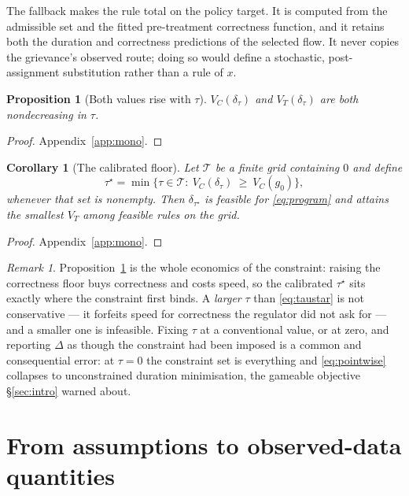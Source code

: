 \documentclass[11pt,a4paper]{article}
\theoremstyle{plain}
\newtheorem{proposition}[theorem]{Proposition}
\newtheorem{corollary}[theorem]{Corollary}
\theoremstyle{definition}
\theoremstyle{remark}
\newtheorem*{remark*}{Remark}
\begin{document}
The fallback makes the rule total on the policy target. It is computed from the admissible set
and the fitted pre-treatment correctness function, and it retains both the duration and
correctness predictions of the selected flow. It never copies the grievance's observed route;
doing so would define a stochastic, post-assignment substitution rather than a rule of $x$.

\begin{proposition}[Both values rise with $\tau$]\label{prop:mono}
$V_C(\delta_\tau)$ and $V_T(\delta_\tau)$ are both nondecreasing in $\tau$.
\end{proposition}

\begin{proof}
Appendix~\ref{app:mono}.
\end{proof}

\begin{corollary}[The calibrated floor]\label{cor:feasible}
Let $\mathcal T$ be a finite grid containing $0$ and define
\begin{equation}
\tau^\star=\min\bigl\{\tau\in\mathcal T:\ V_C(\delta_\tau)\ \ge\ V_C(g_0)\bigr\},
\label{eq:taustar}
\end{equation}
whenever that set is nonempty. Then $\delta_{\tau^\star}$ is feasible for \eqref{eq:program} and
attains the smallest $V_T$ among feasible rules on the grid.
\end{corollary}

\begin{proof}
Appendix~\ref{app:mono}.
\end{proof}

\begin{remark*}
Proposition~\ref{prop:mono} is the whole economics of the constraint: raising the correctness
floor buys correctness and costs speed, so the calibrated $\tau^\star$ sits exactly where the
constraint first binds. A \emph{larger} $\tau$ than \eqref{eq:taustar} is not conservative ---
it forfeits speed for correctness the regulator did not ask for --- and a smaller one is
infeasible. Fixing $\tau$ at a conventional value, or at zero, and reporting $\Delta$ as though
the constraint had been imposed is a common and consequential error: at $\tau=0$ the constraint
set is everything and \eqref{eq:pointwise} collapses to unconstrained duration minimisation, the
gameable objective \S\ref{sec:intro} warned about.
\end{remark*}

\section{From assumptions to observed-data quantities}\label{sec:ident}
\end{document}
